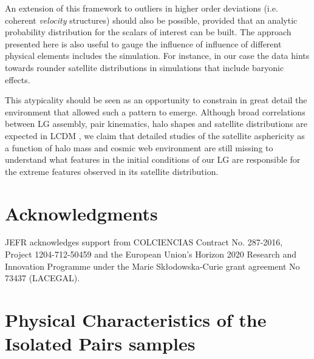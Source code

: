 \documentclass[a4paper,fleqn,usenatbib]{mnras}
\begin{document}
An extension of this framework to outliers in higher order deviations
(i.e. coherent \emph{velocity} structures) should also be possible, 
provided that an analytic probability distribution for the scalars of
interest can be built.  
The approach presented here is also useful to gauge the influence of 
influence of different physical elements includes the simulation. 
For instance, in our case the data hints towards rounder satellite
distributions in simulations that include baryonic effects.  

This atypicality should be seen as an opportunity to constrain in
great detail the environment that allowed such a pattern to emerge. 
Although broad correlations between LG assembly, pair kinematics, halo
shapes and satellite distributions are expected in LCDM
\citep{2011MNRAS.417.1434F,2014MNRAS.443.1090F,2015ApJ...799...45F,2015MNRAS.452.1052L},
we claim that detailed studies of the satellite asphericity as a
function of halo mass and cosmic web environment are still missing to
understand what features in the initial conditions of our LG are
responsible for the extreme features observed in its satellite
distribution. 

\section*{Acknowledgments} 
JEFR acknowledges support from COLCIENCIAS Contract No. 287-2016,
Project 1204-712-50459 and the European Union's Horizon 2020 Research and Innovation
Programme under the Marie Sk\l{}odowska-Curie grant agreement No 73437
(LACEGAL).   
  



\appendix


\section{Physical Characteristics of the Isolated Pairs samples}
\label{appendix:physical}
\end{document}
